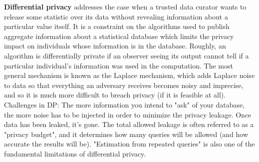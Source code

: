\documentclass[11pt]{article}
\begin{document}
\par \textbf{Differential privacy} addresses the case when a trusted data curator wants to release some statistic over its data without revealing information about a particular value itself. It is a constraint on the algorithms used to publish aggregate information about a statistical database which limits the privacy impact on individuals whose information is in the database. Roughly, an algorithm is differentially private if an observer seeing its output cannot tell if a particular individual's information was used in the computation. The most general mechanism is known as the Laplace mechanism, which adds Laplace noise to data so that everything an adversary receives becomes noisy and imprecise, and so it is much more difficult to breach privacy (if it is feasible at all). Challenges in DP: The more information you intend to "ask" of your database, the more noise has to be injected in order to minimize the privacy leakage. Once data has been leaked, it's gone. The total allowed leakage is often referred to as a "privacy budget", and it determines how many queries will be allowed (and how accurate the results will be). "Estimation from repeated queries" is also one of the fundamental limitations of differential privacy.
\end{document}
